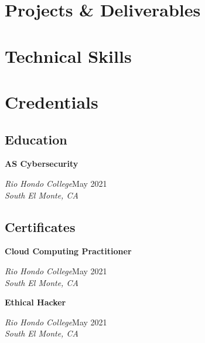 \documentclass[a4paper]{article}
\begin{document}
\section{Projects \& Deliverables}
\appprojectsdeliverables{}
\begin{minipage}[t]{0.60\textwidth}
  \raggedright
  \section{Technical Skills}
  \begin{itemize}
    \apptechnicalskills{}
  \end{itemize}
\end{minipage}\hfill
\begin{minipage}[t]{0.38\textwidth}
  \section{Credentials}
  \subsection{Education}
  \textbf{AS Cybersecurity}\par
  \textit{Rio Hondo College}\hfill May 2021 \\
  \textit{South El Monte, CA}
  \subsection{Certificates}
  \textbf{Cloud Computing Practitioner}\par
  \textit{Rio Hondo College}\hfill May 2021 \\
  \textit{South El Monte, CA}

  \textbf{Ethical Hacker}\par
  \textit{Rio Hondo College}\hfill May 2021 \\
  \textit{South El Monte, CA}
\end{minipage}
\end{document}
